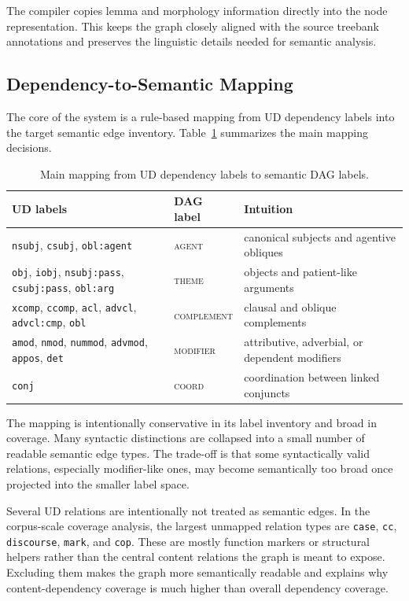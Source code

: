 \documentclass[11pt]{article}
\begin{document}
The compiler copies lemma and morphology information directly into the node
representation. This keeps the graph closely aligned with the source treebank
annotations and preserves the linguistic details needed for semantic analysis.

\subsection{Dependency-to-Semantic Mapping}
The core of the system is a rule-based mapping from UD dependency labels into
the target semantic edge inventory. Table~\ref{tab:mapping} summarizes the
main mapping decisions.

\begin{table}[t]
\centering
\caption{Main mapping from UD dependency labels to semantic DAG labels.}
\label{tab:mapping}
\begin{tabular}{>{\raggedright\arraybackslash}p{2.0in} >{\raggedright\arraybackslash}p{1.4in} >{\raggedright\arraybackslash}p{2.5in}}
\toprule
UD labels & DAG label & Intuition \\
\midrule
\texttt{nsubj}, \texttt{csubj}, \texttt{obl:agent} & \textsc{agent} & canonical subjects and agentive obliques \\
\texttt{obj}, \texttt{iobj}, \texttt{nsubj:pass}, \texttt{csubj:pass}, \texttt{obl:arg} & \textsc{theme} & objects and patient-like arguments \\
\texttt{xcomp}, \texttt{ccomp}, \texttt{acl}, \texttt{advcl}, \texttt{advcl:cmp}, \texttt{obl} & \textsc{complement} & clausal and oblique complements \\
\texttt{amod}, \texttt{nmod}, \texttt{nummod}, \texttt{advmod}, \texttt{appos}, \texttt{det} & \textsc{modifier} & attributive, adverbial, or dependent modifiers \\
\texttt{conj} & \textsc{coord} & coordination between linked conjuncts \\
\bottomrule
\end{tabular}
\end{table}

The mapping is intentionally conservative in its label inventory and broad in
coverage. Many syntactic distinctions are collapsed into a small number of
readable semantic edge types. The trade-off is that some syntactically valid
relations, especially modifier-like ones, may become semantically too broad once
projected into the smaller label space.

Several UD relations are intentionally not treated as semantic edges. In the
corpus-scale coverage analysis, the largest unmapped relation types are
\texttt{case}, \texttt{cc}, \texttt{discourse}, \texttt{mark}, and \texttt{cop}.
These are mostly function markers or structural helpers rather than the central
content relations the graph is meant to expose. Excluding them makes the graph
more semantically readable and explains why content-dependency coverage is much
higher than overall dependency coverage.
\end{document}
